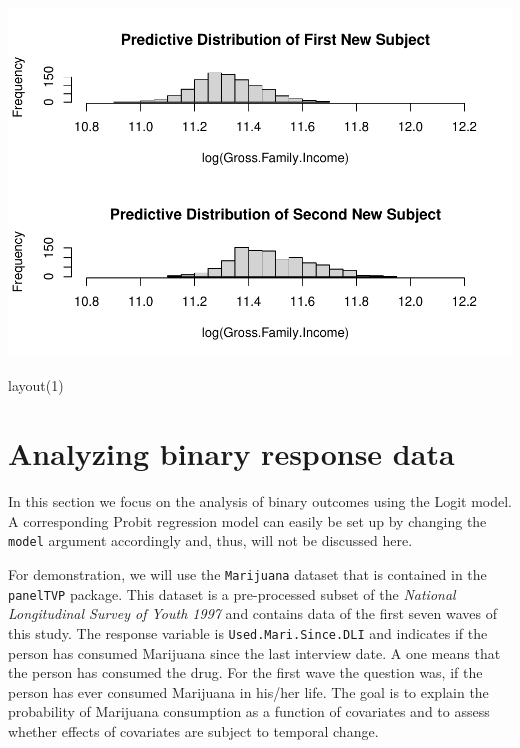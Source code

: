 \documentclass[a4paper, preprint, 3p,
authoryear]{elsarticle} %
\newenvironment{Shaded}{\begin{snugshade}}{\end{snugshade}}
\newcommand{\NormalTok}[1]{#1}
\newcommand{\pandocbounded}[1]{#1}
\begin{document}
\pandocbounded{\includegraphics[keepaspectratio]{Vignette-for-panelTVP_files/figure-latex/unnamed-chunk-28-1.pdf}}

\begin{Shaded}
\begin{Highlighting}[]
\NormalTok{layout(1)}
\end{Highlighting}
\end{Shaded}

\section{Analyzing binary response
data}\label{analyzing-binary-response-data}

In this section we focus on the analysis of binary outcomes using the
Logit model. A corresponding Probit regression model can easily be set
up by changing the \texttt{model} argument accordingly and, thus, will
not be discussed here.

For demonstration, we will use the \texttt{Marijuana} dataset that is
contained in the \texttt{panelTVP} package. This dataset is a
pre-processed subset of the
\textit{National Longitudinal Survey of Youth 1997} and contains data of
the first seven waves of this study. The response variable is
\texttt{Used.Mari.Since.DLI} and indicates if the person has consumed
Marijuana since the last interview date. A one means that the person has
consumed the drug. For the first wave the question was, if the person
has ever consumed Marijuana in his/her life. The goal is to explain the
probability of Marijuana consumption as a function of covariates and to
assess whether effects of covariates are subject to temporal change.
\end{document}
